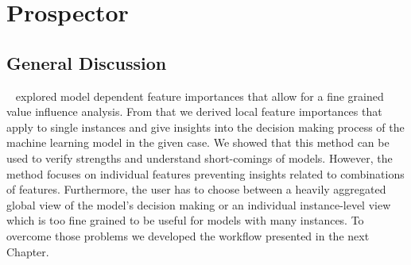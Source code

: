 \chapter{Prospector}
\label{chap:prospector}


\section{General Discussion}
\prospector~\cite{prospector} explored model dependent feature importances that allow for a fine grained value influence analysis.
From that we derived local feature importances that apply to single instances and give insights into the decision making process of the machine learning model in the given case.
We showed that this method can be used to verify strengths and understand short-comings of models.
However, the method focuses on individual features preventing insights related to combinations of features.
Furthermore, the user has to choose between a heavily aggregated global view of the model's decision making or an individual instance-level view which is too fine grained to be useful for models with many instances.
To overcome those problems we developed the workflow presented in the next Chapter.


% 


